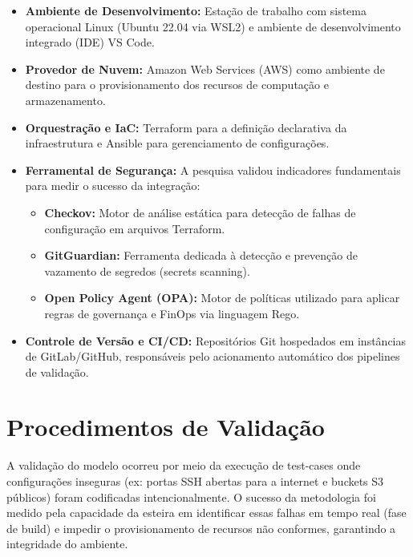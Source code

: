 \begin{itemize}
    \item\textbf{Ambiente de Desenvolvimento:} Estação de trabalho com sistema operacional Linux (Ubuntu 22.04 via WSL2) e ambiente de desenvolvimento integrado (IDE) VS Code.
    
    \item\textbf{Provedor de Nuvem:} Amazon Web Services (AWS) como ambiente de destino para o provisionamento dos recursos de computação e armazenamento.
    
    \item\textbf{Orquestração e IaC:} Terraform para a definição declarativa da infraestrutura e Ansible para gerenciamento de configurações.

    \item \textbf{Ferramental de Segurança:}
    A pesquisa validou indicadores fundamentais para medir o sucesso da integração:
    \begin{itemize}
        \item \textbf{Checkov:} Motor de análise estática para detecção de falhas de configuração em arquivos Terraform.
        \item \textbf{GitGuardian:} Ferramenta dedicada à detecção e prevenção de vazamento de segredos (secrets scanning).
        \item \textbf{Open Policy Agent (OPA):} Motor de políticas utilizado para aplicar regras de governança e FinOps via linguagem Rego.
    \end{itemize}

     \item\textbf{Controle de Versão e CI/CD:} Repositórios Git hospedados em instâncias de GitLab/GitHub, responsáveis pelo acionamento automático dos pipelines de validação.
\end{itemize}

\section{Procedimentos de Validação}
A validação do modelo ocorreu por meio da execução de test-cases onde configurações inseguras (ex: portas SSH abertas para a internet e buckets S3 públicos) foram codificadas intencionalmente. O sucesso da metodologia foi medido pela capacidade da esteira em identificar essas falhas em tempo real (fase de build) e impedir o provisionamento de recursos não conformes, garantindo a integridade do ambiente.